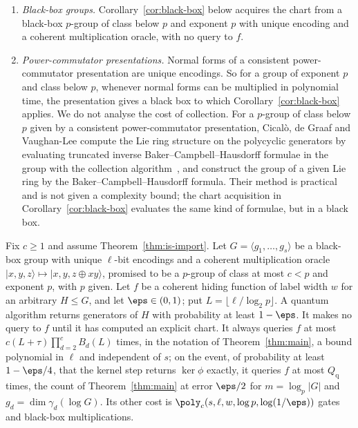 \begin{enumerate}[label=(\alph*),leftmargin=2em]
  \item \emph{Black-box groups.} Corollary~\ref{cor:black-box} below acquires the chart from a black-box $p$-group of class below $p$ and exponent $p$ with unique encoding and a coherent multiplication oracle, with no query to $f$.
  \item \emph{Power-commutator presentations.} Normal forms of a consistent power-commutator presentation are unique encodings. So for a group of exponent $p$ and class below $p$, whenever normal forms can be multiplied in polynomial time, the presentation gives a black box to which Corollary~\ref{cor:black-box} applies. We do not analyse the cost of collection. For a $p$-group of class below $p$ given by a consistent power-commutator presentation, Cical\`o, de Graaf and Vaughan-Lee compute the Lie ring structure on the polycyclic generators by evaluating truncated inverse Baker--Campbell--Hausdorff formulae in the group with the collection algorithm~\cite[\S7]{CicaloDeGraafVaughanLee2012}, and construct the group of a given Lie ring by the Baker--Campbell--Hausdorff formula. Their method is practical and is not given a complexity bound; the chart acquisition in Corollary~\ref{cor:black-box} evaluates the same kind of formulae, but in a black box.
\end{enumerate}


\begin{corollary}
\label{cor:black-box}
Fix $c \ge 1$ and assume Theorem~\ref{thm:is-import}. Let $G = \langle g_1,\dots,g_s\rangle$ be a black-box group with unique $\ell$-bit encodings and a coherent multiplication oracle $|x,y,z\rangle \mapsto |x,y,z\oplus xy\rangle$, promised to be a $p$-group of class at most $c < p$ and exponent $p$, with $p$ given. Let $f$ be a coherent hiding function of label width $w$ for an arbitrary $H \le G$, and let $\eps \in (0,1)$; put $L = \lfloor \ell/\log_2 p\rfloor$. A quantum algorithm returns generators of $H$ with probability at least $1-\eps$. It makes no query to $f$ until it has computed an explicit chart. It always queries $f$ at most $c(L+\tau)\prod_{d=2}^{c}B_d(L)$ times, in the notation of Theorem~\ref{thm:main}, a bound polynomial in $\ell$ and independent of $s$; on the event, of probability at least $1-\eps/4$, that the kernel step returns $\ker\phi$ exactly, it queries $f$ at most $Q_{\mathrm q}$ times, the count of Theorem~\ref{thm:main} at error $\eps/2$ for $m = \log_p|G|$ and $g_d = \dim\gamma_d(\log G)$. Its other cost is $\poly_c(s,\ell,w,\log p,\log(1/\eps))$ gates and black-box multiplications.
\end{corollary}

